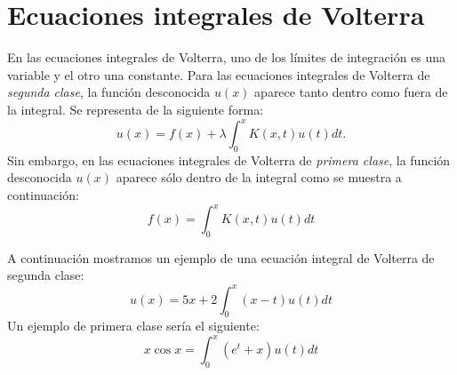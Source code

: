 \section{Ecuaciones integrales de Volterra}
\begin{definicion}
	En las ecuaciones integrales de Volterra, uno de los límites de integración es una variable y el otro una constante. Para las ecuaciones integrales de Volterra de \textit{segunda clase}, la función desconocida $u(x)$ aparece tanto dentro como fuera de la integral. Se representa de la siguiente forma:
	\begin{equation}\label{eq:volterra}
		u(x) = f(x) + \lambda \int_0^x K(x,t)u(t)dt.
	\end{equation}
	Sin embargo, en las ecuaciones integrales de Volterra de \textit{primera clase}, la función desconocida $u(x)$ aparece sólo dentro de la integral como se muestra a continuación:
	\begin{equation}\label{}
		f(x) = \int_0^x K(x,t)u(t)dt
	\end{equation}
\end{definicion}
\begin{ejemplo}
	A continuación mostramos un ejemplo de una ecuación integral de Volterra de segunda clase:
	\begin{equation}\label{}
		u(x) = 5x + 2\int_0^x (x-t)u(t)dt
	\end{equation}
	Un ejemplo de primera clase sería el siguiente:
	\begin{equation}\label{}
	x\cos x = \int_0^x (e^t + x)u(t)dt
	\end{equation}	
\end{ejemplo}

